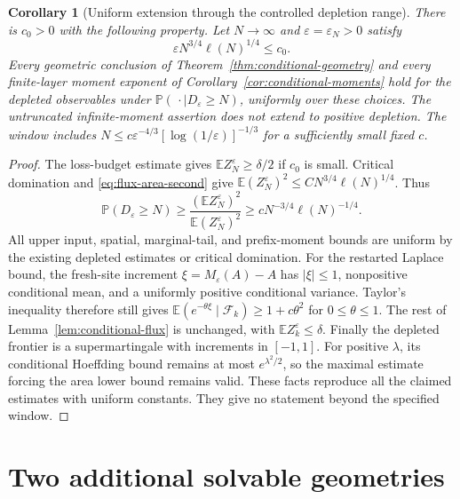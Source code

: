 \documentclass[11pt]{article}
\numberwithin{equation}{section}
\newtheorem{corollary}[theorem]{Corollary}
\theoremstyle{definition}
\newcommand{\E}{\mathbb E}
\newcommand{\Prob}{\mathbb P}
\begin{document}
\begin{corollary}[Uniform extension through the controlled depletion range]\label{cor:depleted-conditional-geometry}
There is $c_0>0$ with the following property. Let $N\to\infty$ and $\varepsilon=\varepsilon_N>0$ satisfy
\begin{equation}\label{eq:conditional-depletion-window}
 \varepsilon N^{3/4}\ell(N)^{1/4}\le c_0.
\end{equation}
Every geometric conclusion of Theorem~\ref{thm:conditional-geometry} and every finite-layer moment exponent of Corollary~\ref{cor:conditional-moments} hold for the depleted observables under $\Prob(\,\cdot\mid D_\varepsilon\ge N)$, uniformly over these choices. The untruncated infinite-moment assertion does not extend to positive depletion. The window includes $N\le c\varepsilon^{-4/3}[\log(1/\varepsilon)]^{-1/3}$ for a sufficiently small fixed $c$.
\end{corollary}
\begin{proof}
The loss-budget estimate gives $\E Z_N^\varepsilon\ge\delta/2$ if $c_0$ is small. Critical domination and \eqref{eq:flux-area-second} give $\E(Z_N^\varepsilon)^2\le C N^{3/4}\ell(N)^{1/4}$. Thus
\[
 \Prob(D_\varepsilon\ge N)
 \ge\frac{(\E Z_N^\varepsilon)^2}{\E(Z_N^\varepsilon)^2}
 \ge c N^{-3/4}\ell(N)^{-1/4}.
\]
All upper input, spatial, marginal-tail, and prefix-moment bounds are uniform by the existing depleted estimates or critical domination. For the restarted Laplace bound, the fresh-site increment $\xi=M_\varepsilon(A)-A$ has $|\xi|\le1$, nonpositive conditional mean, and a uniformly positive conditional variance. Taylor's inequality therefore still gives $\E(e^{-\theta\xi}\mid\mathcal F_k)\ge1+c\theta^2$ for $0\le\theta\le1$. The rest of Lemma~\ref{lem:conditional-flux} is unchanged, with $\E Z_k^\varepsilon\le\delta$. Finally the depleted frontier is a supermartingale with increments in $[-1,1]$. For positive $\lambda$, its conditional Hoeffding bound remains at most $e^{\lambda^2/2}$, so the maximal estimate forcing the area lower bound remains valid. These facts reproduce all the claimed estimates with uniform constants. They give no statement beyond the specified window.
\end{proof}

\section{Two additional solvable geometries}\label{sec:solvable}
\end{document}
